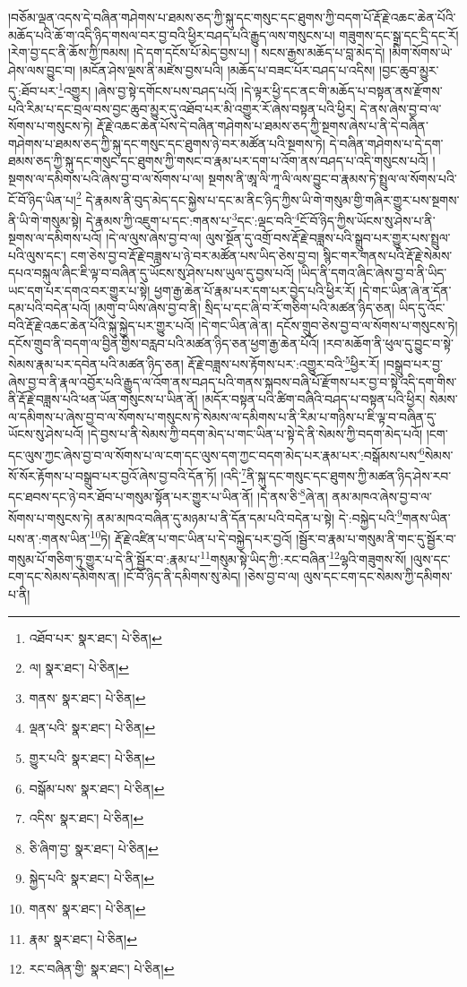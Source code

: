 །བཅོམ་ལྡན་འདས་དེ་བཞིན་གཤེགས་པ་ཐམས་ཅད་ཀྱི་སྐུ་དང་གསུང་དང་ཐུགས་ཀྱི་བདག་པོ་རྡོ་རྗེ་འཆང་ཆེན་པོའི་མཆོད་པའི་ཆོ་ག་འདི་ཉིད་གསལ་བར་བྱ་བའི་ཕྱིར་བཤད་པའི་རྒྱུད་ལས་གསུངས་པ། གཟུགས་དང་སྒྲ་དང་དྲི་དང་རོ། །རེག་བྱ་དང་ནི་ཆོས་ཀྱི་ཁམས། །དེ་དག་དངོས་པོ་མེད་བྱས་པ། །
སངས་རྒྱས་མཆོད་པ་བླ་མེད་དེ། །མིག་སོགས་ཡེ་ཤེས་ལས་བྱུང་བ། །མངོན་ཤེས་ལྔས་ནི་མཛེས་བྱས་པའི། །མཆོད་པ་བཟང་པོར་བཤད་པ་འདིས། །བྱང་ཆུབ་མྱུར་དུ་:ཐོབ་པར་\footnote{འཐོབ་པར་  སྣར་ཐང་།  པེ་ཅིན། }འགྱུར། །ཞེས་བྱ་སྟེ་དགོངས་པས་བཤད་པའོ། །དེ་ལྟར་ཕྱི་དང་ནང་གི་མཆོད་པ་བསྟན་ནས་རྫོགས་པའི་རིམ་པ་དང་བྲལ་བས་བྱང་ཆུབ་མྱུར་དུ་འཐོབ་པར་མི་འགྱུར་རོ་ཞེས་བསྟན་པའི་ཕྱིར། དེ་ནས་ཞེས་བྱ་བ་ལ་སོགས་པ་གསུངས་ཏེ། རྡོ་རྗེ་འཆང་ཆེན་པོས་དེ་བཞིན་གཤེགས་པ་ཐམས་ཅད་ཀྱི་སྔགས་ཞེས་པ་ནི་དེ་བཞིན་གཤེགས་པ་ཐམས་ཅད་ཀྱི་སྐུ་དང་གསུང་དང་ཐུགས་ཉེ་བར་མཚོན་པའི་སྔགས་ཏེ། དེ་བཞིན་གཤེགས་པ་དེ་དག་ཐམས་ཅད་ཀྱི་སྐུ་དང་གསུང་དང་ཐུགས་ཀྱི་གསང་བ་རྣམ་པར་དག་པ་འོག་ནས་བཤད་པ་འདི་གསུངས་པའོ། །སྔགས་ལ་དམིགས་པའི་ཞེས་བྱ་བ་ལ་སོགས་པ་ལ། སྔགས་ནི་ཨཱ་ལི་ཀཱ་ལི་ལས་བྱུང་བ་རྣམས་ཏེ་སྤྲུལ་ལ་སོགས་པའི་ངོ་བོ་ཉིད་ཡིན་པ།\footnote{ལ།  སྣར་ཐང་།  པེ་ཅིན། } དེ་རྣམས་ནི་བུད་མེད་དང་སྐྱེས་པ་དང་མ་ནིང་ཉིད་ཀྱིས་ཡི་གེ་གསུམ་གྱི་གཞིར་གྱུར་པས་སྔགས་ནི་ཡི་གེ་གསུམ་སྟེ། དེ་རྣམས་ཀྱི་འཇུག་པ་དང་:གནས་པ་\footnote{གནས་  སྣར་ཐང་།  པེ་ཅིན། }དང་:ལྡང་བའི་\footnote{ལྡན་པའི་  སྣར་ཐང་།  པེ་ཅིན། }ངོ་བོ་ཉིད་ཀྱིས་ཡོངས་སུ་ཤེས་པ་ནི་སྔགས་ལ་དམིགས་པའོ། །དེ་ལ་ལུས་ཞེས་བྱ་བ་ལ། ལུས་སྔོན་དུ་འགྲོ་བས་རྡོ་རྗེ་བཟླས་པའི་སྒྲུབ་པར་གྱུར་པས་སྤྲུལ་པའི་ལུས་དང་། ངག་ཅེས་བྱ་བ་རྡོ་རྗེ་བཟླས་པ་ཉེ་བར་མཚོན་པས་ཡིད་ཅེས་བྱ་བ། སྙིང་གར་གནས་པའི་རྡོ་རྗེ་སེམས་དཔའ་བསྐུལ་ཞིང་ཇི་ལྟ་བ་བཞིན་དུ་ཡོངས་སུ་ཤེས་པས་ཡུལ་དུ་བྱས་པའོ། །ཡིད་ནི་དགའ་ཞིང་ཞེས་བྱ་བ་ནི་ཡིད་ཡང་དག་པར་དགའ་བར་གྱུར་པ་སྟེ། ཕྱག་རྒྱ་ཆེན་པོ་རྣམ་པར་དག་པར་བྱེད་པའི་ཕྱིར་རོ། །དེ་གང་ཡིན་ཞེ་ན་དོན་དམ་པའི་བདེན་པའོ། །མགུ་བ་ཡིས་ཞེས་བྱ་བ་ནི། སྲིད་པ་དང་ཞི་བ་རོ་གཅིག་པའི་མཚན་ཉིད་ཅན། ཡིད་དུ་འོང་བའི་རྡོ་རྗེ་འཆང་ཆེན་པོའི་སྐུ་སྐྱེད་པར་གྱུར་པའོ། །དེ་གང་ཡིན་ཞེ་ན། དངོས་གྲུབ་ཅེས་བྱ་བ་ལ་སོགས་པ་གསུངས་ཏེ། དངོས་གྲུབ་ནི་བདག་ལ་བྱིན་གྱིས་བརླབ་པའི་མཚན་ཉིད་ཅན་ཕྱག་རྒྱ་ཆེན་པོའོ། །རབ་མཆོག་ནི་ཕུལ་དུ་བྱུང་བ་སྟེ་སེམས་རྣམ་པར་དབེན་པའི་མཚན་ཉིད་ཅན། རྡོ་རྗེ་བཟླས་པས་རྟོགས་པར་:འགྱུར་བའི་\footnote{གྱུར་པའི་  སྣར་ཐང་།  པེ་ཅིན། }ཕྱིར་རོ། །བསྒྲུབ་པར་བྱ་ཞེས་བྱ་བ་ནི་རྣལ་འབྱོར་པའི་རྒྱུད་ལ་འོག་ནས་བཤད་པའི་གནས་སྐབས་བཞི་པོ་རྫོགས་པར་བྱ་བ་སྟེ་འདི་དག་གིས་ནི་རྡོ་རྗེ་བཟླས་པའི་ཕན་ཡོན་གསུངས་པ་ཡིན་ནོ། །མདོར་བསྟན་པའི་ཚིག་བཞིའི་བཤད་པ་བསྟན་པའི་ཕྱིར། སེམས་ལ་དམིགས་པ་ཞེས་བྱ་བ་ལ་སོགས་པ་གསུངས་ཏེ་སེམས་ལ་དམིགས་པ་ནི་རིམ་པ་གཉིས་པ་ཇི་ལྟ་བ་བཞིན་དུ་ཡོངས་སུ་ཤེས་པའོ། །དེ་བྱས་པ་ནི་སེམས་ཀྱི་བདག་མེད་པ་གང་ཡིན་པ་སྟེ་དེ་ནི་སེམས་ཀྱི་བདག་མེད་པའོ། །ངག་དང་ལུས་ཀྱང་ཞེས་བྱ་བ་ལ་སོགས་པ་ལ་ངག་དང་ལུས་དག་ཀྱང་བདག་མེད་པར་རྣམ་པར་:བསྒོམས་པས་\footnote{བསྒོམ་པས་  སྣར་ཐང་།  པེ་ཅིན། }སེམས་སོ་སོར་རྟོགས་པ་བསྒྲུབ་པར་བྱའོ་ཞེས་བྱ་བའི་དོན་ཏོ། །འདི་\footnote{འདིས་  སྣར་ཐང་།  པེ་ཅིན། }ནི་སྐུ་དང་གསུང་དང་ཐུགས་ཀྱི་མཚན་ཉིད་ཤེས་རབ་དང་ཐབས་དང་ཉེ་བར་ཐོབ་པ་གསུམ་སྟོན་པར་གྱུར་པ་ཡིན་ནོ། །དེ་ནས་ཅི་\footnote{ཅི་ཞིག་བྱ་  སྣར་ཐང་།  པེ་ཅིན། }ཞེ་ན། ནམ་མཁའ་ཞེས་བྱ་བ་ལ་སོགས་པ་གསུངས་ཏེ། ནམ་མཁའ་བཞིན་དུ་མཉམ་པ་ནི་དོན་དམ་པའི་བདེན་པ་སྟེ། དེ་:བསྐྱེད་པའི་\footnote{སྐྱེད་པའི་  སྣར་ཐང་།  པེ་ཅིན། }གནས་ཡིན་པས་ན་:གནས་ཡིན་\footnote{གནས་  སྣར་ཐང་།  པེ་ཅིན། }ཏེ། རྡོ་རྗེ་འཛིན་པ་གང་ཡིན་པ་དེ་བསྐྱེད་པར་བྱའོ། །སྦྱོར་བ་རྣམ་པ་གསུམ་ནི་གང་དུ་སྦྱོར་བ་གསུམ་པོ་གཅིག་ཏུ་གྱུར་པ་དེ་ནི་སྦྱོར་བ་:རྣམ་པ་\footnote{རྣམ་  སྣར་ཐང་།  པེ་ཅིན། }གསུམ་སྟེ་ཡིད་ཀྱི་:རང་བཞིན་\footnote{རང་བཞིན་གྱི་  སྣར་ཐང་།  པེ་ཅིན། }ལྷའི་གཟུགས་སོ། །ལུས་དང་ངག་དང་སེམས་དམིགས་ན། །ངོ་བོ་ཉིད་ནི་དམིགས་སུ་མེད། །ཅེས་བྱ་བ་ལ། ལུས་དང་ངག་དང་སེམས་ཀྱི་དམིགས་པ་ནི། 
